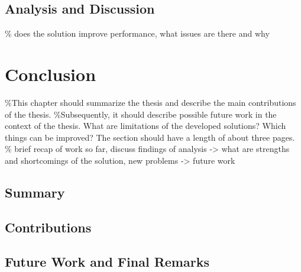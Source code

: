 \section{Analysis and Discussion}
\% does the solution improve performance, what issues are there and why


\chapter{Conclusion}

\%This chapter should summarize the thesis and describe the main contributions of the thesis.
\%Subsequently, it should describe possible future work in the context of the thesis. What are limitations of the developed solutions? Which things can be improved? The section should have a length of about three pages.
\% brief recap of work so far, discuss findings of analysis -> what are strengths and shortcomings of the solution, new problems -> future work

\section{Summary}
\section{Contributions}
\section{Future Work and Final Remarks}



